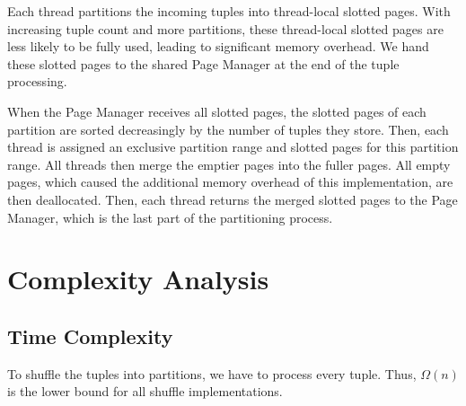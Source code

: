 Each thread partitions the incoming tuples into thread-local slotted pages.
With increasing tuple count and more partitions, these thread-local slotted pages are less likely to be fully used, leading to significant memory overhead.
We hand these slotted pages to the shared Page Manager at the end of the tuple processing.

When the Page Manager receives all slotted pages, the slotted pages of each partition are sorted decreasingly by the number of tuples they store.
Then, each thread is assigned an exclusive partition range and slotted pages for this partition range.
All threads then merge the emptier pages into the fuller pages.
All empty pages, which caused the additional memory overhead of this implementation, are then deallocated.
Then, each thread returns the merged slotted pages to the Page Manager, which is the last part of the partitioning process.

\section{Complexity Analysis}
\subsection{Time Complexity}
To shuffle the tuples into partitions, we have to process every tuple.
Thus, $\Omega(n)$ is the lower bound for all shuffle implementations.
